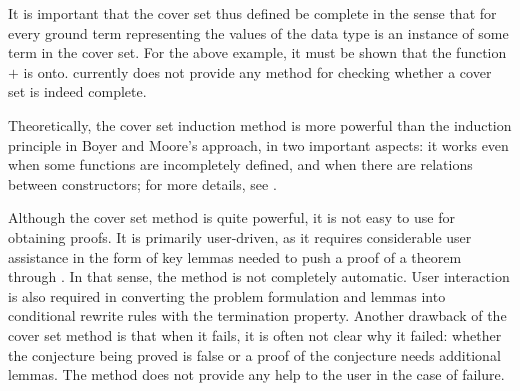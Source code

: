 It is important that the cover set thus defined be complete in the
sense that for every ground term representing the values of the data
type is an instance of some term in the cover set. For the above
example, it must be shown that the function $+$ is onto. \RRL
currently does not provide any method for checking whether a cover set
is indeed complete.

Theoretically, the cover set induction method is more powerful than
the induction principle in Boyer and Moore's approach, in two important
aspects: it works even when some functions are incompletely defined,
and when there are relations between constructors; for more details,
see \cite{ZKM88,Zhang88}.

Although the cover set method is quite powerful, it is not easy to use
for obtaining proofs. It is primarily user-driven, as it requires
considerable user assistance in the form of key lemmas needed to push
a proof of a theorem through \ERRL.  In that sense, the method is not
completely automatic.  User interaction is also required in converting
the problem formulation and lemmas into conditional rewrite rules with
the termination property.
Another drawback of the cover set method is that when it fails, it is
often not clear why it failed: whether the conjecture being proved is
false or a proof of the conjecture needs additional lemmas.  The
method does not provide any help to the user in the case of failure.



